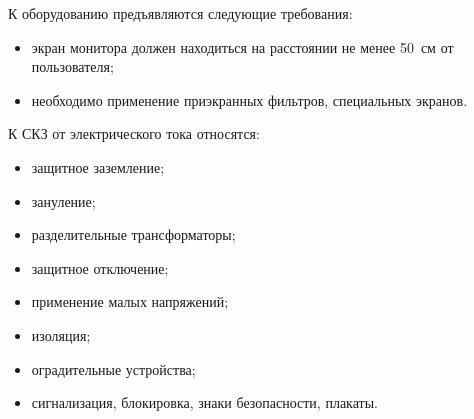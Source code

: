 К оборудованию предъявляются следующие требования:
\begin{itemize}
    \item экран монитора должен находиться на расстоянии не менее 50~см от пользователя;
    \item необходимо применение приэкранных фильтров, специальных экранов.
\end{itemize}

К СКЗ от электрического тока относятся:
\begin{itemize}
    \item защитное заземление;
    \item зануление;
    \item разделительные трансформаторы;
    \item защитное отключение;
    \item применение малых напряжений;
    \item изоляция;
    \item оградительные устройства;
    \item сигнализация, блокировка, знаки безопасности, плакаты.
\end{itemize}





